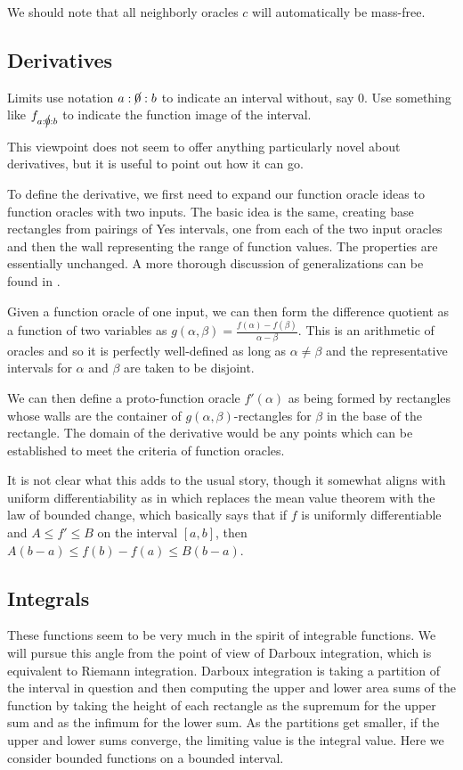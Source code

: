 \documentclass[12pt]{article}
\begin{document}
We should note that all neighborly oracles $c$ will automatically be mass-free. 

\subsection{Derivatives}

Limits use notation $a:\cancel{0}:b$ to indicate an interval without, say $0$. Use something like $f_{a:\cancel{0}:b}$ to indicate the function image of the interval. 


This viewpoint does not seem to offer anything particularly novel about derivatives, but it is useful to point out how it can go. 

To define the derivative, we first need to expand our function oracle ideas to function oracles with two inputs. The basic idea is the same, creating base rectangles from pairings of Yes intervals, one from each of the two input oracles and then the wall representing the range of function values. The properties are essentially unchanged. A more thorough discussion of generalizations can be found in \cite{taylor23metric}.

Given a function oracle of one input, we can then form the difference quotient as a function of two variables as $g(\alpha, \beta) = \frac{ f(\alpha) - f(\beta) }{\alpha - \beta}$. This is an arithmetic of oracles and so it is perfectly well-defined as long as $\alpha \neq \beta$ and the representative intervals for $\alpha$ and $\beta$ are taken to be disjoint. 

We can then define a proto-function oracle $f'(\alpha)$ as being formed by rectangles whose walls are the container of $g(\alpha, \beta)$-rectangles for $\beta$ in the base of the rectangle. The domain of the derivative would be any points which can be established to meet the criteria of function oracles. 

It is not clear what this adds to the usual story, though it somewhat aligns with uniform differentiability as in \cite{BriStol} which replaces the mean value theorem with the law of bounded change, which basically says that if $f$ is uniformly differentiable and $A \leq f' \leq B$ on the interval $[a,b]$, then $A(b-a) \leq f(b)-f(a) \leq B(b-a)$.  

\subsection{Integrals}\label{sec:int}

These functions seem to be very much in the spirit of integrable functions. We will pursue this angle from the point of view of Darboux integration, which is equivalent to Riemann integration. Darboux integration is taking a partition of the interval in question and then computing the upper and lower area sums of the function by taking the height of each rectangle as the supremum for the upper sum and as the infimum for the lower sum. As the partitions get smaller, if the upper and lower sums converge, the limiting value is the integral value. Here we consider bounded functions on a bounded interval. 
\end{document}
